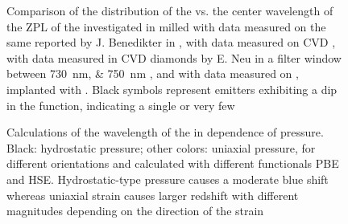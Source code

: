 	\begin{figure}[tp]
		\centering
		\caption{Comparison of the distribution of the \lw vs. the center wavelength of the ZPL of the investigated \sivs in milled \nds with data measured on the same \nds reported by J. Benedikter in \cite{Benedikter2017a}, with data measured on CVD \nds, with data measured in CVD diamonds by E. Neu in a filter window between \SIlist{730; 750}{nm} \cite{Neu2012}, and with data measured on \implantedTao, implanted with \Si. Black symbols represent emitters exhibiting a dip in the \gtz function, indicating a single or very few \sivs}
		\label{fig::bimodal_distr_compare}
	\end{figure}

	\begin{figure}[tp]
		\centering
		\caption{Calculations of the wavelength of the \siv \ZPL in dependence of pressure. Black: hydrostatic pressure; other colors: uniaxial pressure, for different orientations and calculated with different functionals PBE and HSE. Hydrostatic-type pressure causes a moderate blue shift whereas uniaxial strain causes larger redshift with different magnitudes depending on the direction of the strain }
		\label{fig::stress_pressure}
	\end{figure}


